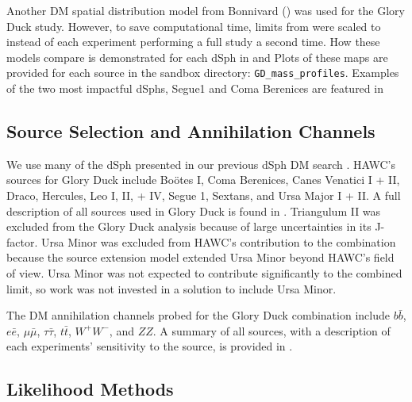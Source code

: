 Another DM spatial distribution model from Bonnivard (\B) \cite{Bonnivard:2014kza} was used for the Glory Duck study.
However, to save computational time, limits from \GS were scaled to \B instead of each experiment performing a full study a second time.
How these models compare is demonstrated for each dSph in  and 
Plots of these maps are provided for each source in the sandbox directory: \texttt{GD\_mass\_profiles}.
Examples of the two most impactful dSphs, Segue1 and Coma Berenices are featured in 

\subsection{Source Selection and Annihilation Channels}\label{sec:gd_srcs_y_chan}

We use many of the dSph presented in our previous dSph DM search \cite{Albert_2018}.
HAWC's sources for Glory Duck include Boötes I, Coma Berenices, Canes Venatici I + II, Draco, Hercules, Leo I, II, + IV, Segue 1, Sextans, and Ursa Major I + II.
A full description of all sources used in Glory Duck is found in .
Triangulum II was excluded from the Glory Duck analysis because of large uncertainties in its J-factor.
Ursa Minor was excluded from HAWC's contribution to the combination because the source extension model extended Ursa Minor beyond HAWC's field of view.
Ursa Minor was not expected to contribute significantly to the combined limit, so work was not invested in a solution to include Ursa Minor.

The DM annihilation channels probed for the Glory Duck combination include $b\bar{b}$, $e\bar{e}$, $\mu\bar{\mu}$, $\tau\bar{\tau}$, $t\bar{t}$, $W^+W^-$, and $ZZ$.
A summary of all sources, with a description of each experiments' sensitivity to the source, is provided in .




\subsection{Likelihood Methods} \label{sec:gd_ll_methods}

